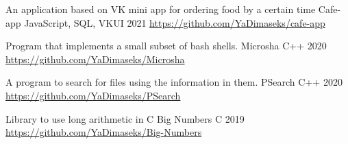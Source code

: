 

\begin{cventries}

  \cventry
  {An application based on VK mini app for ordering food by a certain time} %
  {Cafe-app} %
  {JavaScript, SQL, VKUI} %
  {2021} %
  {\href{https://github.com/YaDimaseks/cafe-app}{https://github.com/YaDimaseks/cafe-app}}

  \begin{flushleft}
  \end{flushleft}

  \cventry
  {Program that implements a small subset of bash shells.} %
  {Microsha} %
  {C++} %
  {2020} %
  {
    \href{https://github.com/YaDimaseks/Microsha}{https://github.com/YaDimaseks/Microsha}
  }

  \cventry
  {A program to search for files using the information in them.} %
  {PSearch} %
  {C++} %
  {2020} %
  {
    \href{https://github.com/YaDimaseks/PSearch}{https://github.com/YaDimaseks/PSearch}
  }

  \cventry
  {Library to use long arithmetic in C} %
  {Big Numbers} %
  {C} %
  {2019} %
  {
    \href{https://github.com/YaDimaseks/Big-Numbers}{https://github.com/YaDimaseks/Big-Numbers}
  }

\end{cventries}
